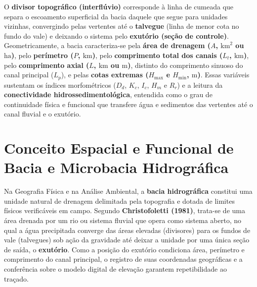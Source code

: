 
\begin{boxSimbolo}
O \textbf{divisor topográfico (interflúvio)} corresponde à linha de cumeada que separa o escoamento superficial da bacia daquele que segue para unidades vizinhas, convergindo pelas vertentes até o \textbf{talvegue} (linha de menor cota no fundo do vale) e deixando o sistema pelo \textbf{exutório (seção de controle)}. Geometricamente, a bacia caracteriza-se pela \textbf{área de drenagem ($A$, $\text{km}^2$ ou $\text{ha}$)}, pelo \textbf{perímetro ($P$, $\text{km}$)}, pelo \textbf{comprimento total dos canais ($L_t$, $\text{km}$)}, pelo \textbf{comprimento axial ($L$, $\text{km}$ ou $\text{m}$)}, distinto do comprimento sinuoso do canal principal ($L_p$), e pelas \textbf{cotas extremas ($H_{\max}$ e $H_{\min}$, $\text{m}$)}. Essas variáveis sustentam os índices morfométricos ($D_d$, $K_c$, $I_c$, $H_m$ e $R_r$) e a leitura da \textbf{conectividade hidrossedimentológica}, entendida como o grau de continuidade física e funcional que transfere água e sedimentos das vertentes até o canal fluvial e o exutório.
\end{boxSimbolo}

\section{Conceito Espacial e Funcional de Bacia e Microbacia Hidrográfica}

Na Geografia Física e na Análise Ambiental, a \textbf{bacia hidrográfica} constitui uma unidade natural de drenagem delimitada pela topografia e dotada de limites físicos verificáveis em campo. Segundo \textbf{Christofoletti (1981)}, trata-se de uma área drenada por um rio ou sistema fluvial que opera como sistema aberto, no qual a água precipitada converge das áreas elevadas (divisores) para os fundos de vale (talvegues) sob ação da gravidade até deixar a unidade por uma única seção de saída, o \textbf{exutório}. Como a posição do exutório condiciona área, perímetro e comprimento do canal principal, o registro de suas coordenadas geográficas e a conferência sobre o modelo digital de elevação garantem repetibilidade ao traçado.

